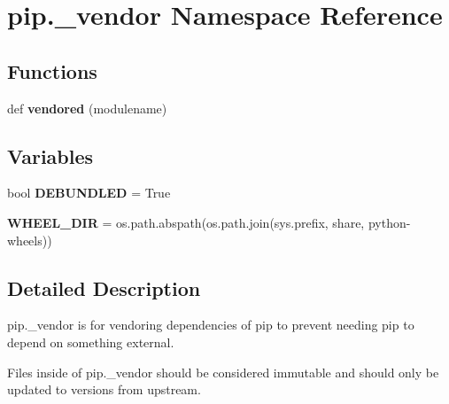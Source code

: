 \hypertarget{namespacepip_1_1__vendor}{}\section{pip.\+\_\+vendor Namespace Reference}
\label{namespacepip_1_1__vendor}
\subsection*{Functions}
\begin{DoxyCompactItemize}
\item 
\mbox{\label{namespacepip_1_1__vendor_a60bedf38e7943004f5ab2d148356e890}} 
def {\bfseries vendored} (modulename)
\end{DoxyCompactItemize}
\subsection*{Variables}
\begin{DoxyCompactItemize}
\item 
\mbox{\label{namespacepip_1_1__vendor_a930323aa8adfd8f8930c466eac190266}} 
bool {\bfseries D\+E\+B\+U\+N\+D\+L\+ED} = True
\item 
\mbox{\label{namespacepip_1_1__vendor_af8bd31398248323cdf81be83bf416c4b}} 
{\bfseries W\+H\+E\+E\+L\+\_\+\+D\+IR} = os.\+path.\+abspath(os.\+path.\+join(sys.\+prefix, \textquotesingle{}share\textquotesingle{}, \textquotesingle{}python-\/wheels\textquotesingle{}))
\end{DoxyCompactItemize}


\subsection{Detailed Description}
\begin{DoxyVerb}pip._vendor is for vendoring dependencies of pip to prevent needing pip to
depend on something external.

Files inside of pip._vendor should be considered immutable and should only be
updated to versions from upstream.
\end{DoxyVerb}
 